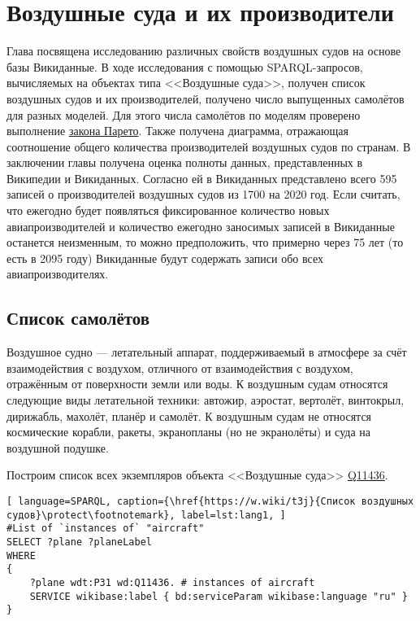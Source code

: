 \chapter{Воздушные суда и их производители}%
\label{ch:aircraft-chapter}

Глава посвящена исследованию различных свойств воздушных судов на основе базы Викиданные. 
В ходе исследования с помощью SPARQL-запросов, вычисляемых на объектах типа <<Воздушные суда>>, 
получен список воздушных судов и их производителей, получено число выпущенных самолётов для разных моделей. Для этого числа самолётов по моделям проверено выполнение \href{https://clck.ru/JvaaU}{закона Парето}. 
Также получена диаграмма, отражающая соотношение общего количества производителей воздушных судов по странам. 
В заключении главы получена оценка полноты данных, представленных в Википедии и Викиданных. Согласно ей в Викиданных представлено всего 595 записей о производителей воздушных судов из \num{1700} на 2020 год.
Если считать, что ежегодно будет появляться фиксированное количество новых авиапроизводителей и количество ежегодно заносимых записей в Викиданные останется неизменным, то можно предположить, что примерно через 75 лет (то есть в 2095 году) Викиданные будут содержать записи обо всех авиапроизводителях.

\section{Список самолётов}

Воздушное судно — летательный аппарат, поддерживаемый в атмосфере за счёт взаимодействия с воздухом, отличного от взаимодействия с воздухом, отражённым от поверхности земли или воды.
К воздушным судам относятся следующие виды летательной техники: автожир, аэростат, вертолёт, винтокрыл, дирижабль, махолёт, планёр и самолёт.
К воздушным судам не относятся космические корабли, ракеты, экранопланы (но не экранолёты) и суда на воздушной подушке. 

Построим список всех экземпляров объекта <<Воздушные суда>> \href{https://www.wikidata.org/wiki/Q11436}{Q11436}.


\begin{lstlisting}[ language=SPARQL, caption={\href{https://w.wiki/t3j}{Список воздушных судов}\protect\footnotemark}, label=lst:lang1, ]
#List of `instances of` "aircraft"
SELECT ?plane ?planeLabel
WHERE
{
    ?plane wdt:P31 wd:Q11436. # instances of aircraft
    SERVICE wikibase:label { bd:serviceParam wikibase:language "ru" }
}
\end{lstlisting}

